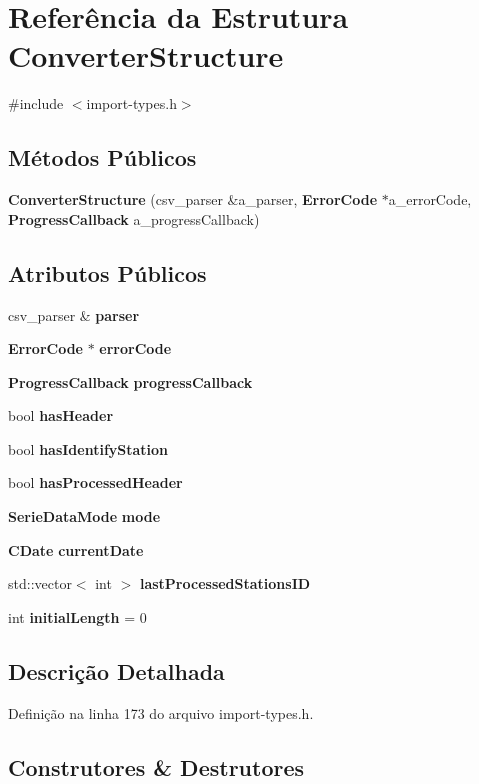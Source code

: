 \section{Referência da Estrutura Converter\+Structure}
\label{struct_converter_structure}


{\ttfamily \#include $<$import-\/types.\+h$>$}

\subsection*{Métodos Públicos}
\begin{DoxyCompactItemize}
\item 
{\bf Converter\+Structure} (csv\+\_\+parser \&a\+\_\+parser, {\bf Error\+Code} $\ast$a\+\_\+error\+Code, {\bf Progress\+Callback} a\+\_\+progress\+Callback)
\end{DoxyCompactItemize}
\subsection*{Atributos Públicos}
\begin{DoxyCompactItemize}
\item 
csv\+\_\+parser \& {\bf parser}
\item 
{\bf Error\+Code} $\ast$ {\bf error\+Code}
\item 
{\bf Progress\+Callback} {\bf progress\+Callback}
\item 
bool {\bf has\+Header}
\item 
bool {\bf has\+Identify\+Station}
\item 
bool {\bf has\+Processed\+Header}
\item 
{\bf Serie\+Data\+Mode} {\bf mode}
\item 
{\bf C\+Date} {\bf current\+Date}
\item 
std\+::vector$<$ int $>$ {\bf last\+Processed\+Stations\+ID}
\item 
int {\bf initial\+Length} = 0
\end{DoxyCompactItemize}


\subsection{Descrição Detalhada}


Definição na linha 173 do arquivo import-\/types.\+h.



\subsection{Construtores \& Destrutores}
